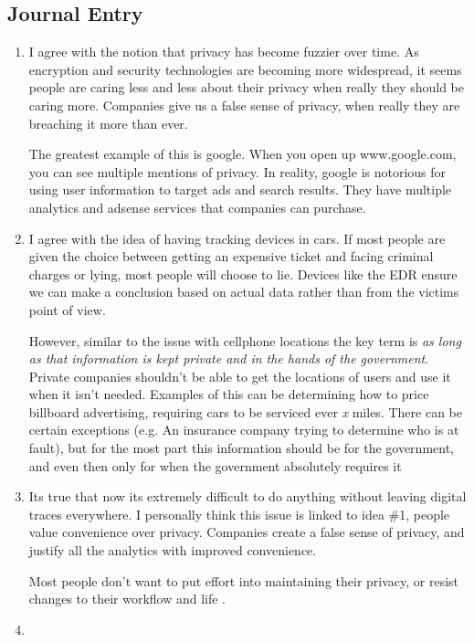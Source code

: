 \documentclass{scrartcl}
\begin{document}
\subsection{Journal Entry}
\label{sec:org2f096c7}
\begin{enumerate}
\item I agree with the notion that privacy has become fuzzier over time. As
encryption and security technologies are becoming more widespread, it seems
people are caring less and less about their privacy when really they should
be caring more. Companies give us a false sense of privacy, when really they
are breaching it more than ever.

The greatest example of this is google. When you open up www.google.com, you
can see multiple mentions of privacy. In reality, google is notorious for
using user information to target ads and search results. They have multiple
analytics and adsense services that companies can purchase.

\item I agree with the idea of having tracking devices in cars. If most people are
given the choice between getting an expensive ticket and facing criminal
charges or lying, most people will choose to lie. Devices like the EDR ensure
we can make a conclusion based on actual data rather than from the victims
point of view.

However, similar to the issue with cellphone locations  the key term is \emph{as
long as that information is kept private and in the hands of the government}.
Private companies shouldn't be able to get the locations of users and use it
when it isn't needed. Examples of this can be determining how to price
billboard advertising, requiring cars to be serviced ever \emph{x} miles.  There can
be certain exceptions (e.g. An insurance company trying to determine who is
at fault), but for the most part this information should be for the
government, and even then only for when the government absolutely requires it

\item Its true that now its extremely difficult to do anything without leaving
digital traces everywhere. I personally think this issue is linked to idea
\#1, people value convenience over privacy. Companies create a false sense of
privacy, and justify all the analytics with improved convenience.

Most people don't want to put effort into maintaining their privacy, or
resist changes to their workflow and life .

\item 
\end{enumerate}
\end{document}
